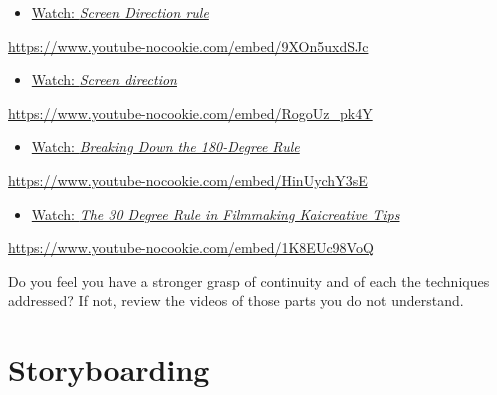 \documentclass[
  letterpaper,
  DIV=11,
  numbers=noendperiod]{scrreprt}
\providecommand{\tightlist}{%
  \setlength{\itemsep}{0pt}\setlength{\parskip}{0pt}}\usepackage{longtable,booktabs,array}
\begin{document}
\begin{tcolorbox}[enhanced jigsaw, opacityback=0, colframe=quarto-callout-note-color-frame, leftrule=.75mm, arc=.35mm, rightrule=.15mm, colbacktitle=quarto-callout-note-color!10!white, titlerule=0mm, colback=white, toprule=.15mm, bottomtitle=1mm, breakable, toptitle=1mm, title={Learning Activity}, coltitle=black, bottomrule=.15mm, left=2mm, opacitybacktitle=0.6]

\begin{itemize}
\tightlist
\item
  \href{https://www.youtube.com/watch?v=9XOn5uxdSJc}{Watch: \emph{Screen
  Direction rule}}
\end{itemize}

\url{https://www.youtube-nocookie.com/embed/9XOn5uxdSJc}

\begin{itemize}
\tightlist
\item
  \href{https://www.youtube.com/watch?v=RogoUz_pk4Y}{Watch: \emph{Screen
  direction}}
\end{itemize}

\url{https://www.youtube-nocookie.com/embed/RogoUz_pk4Y}

\begin{itemize}
\tightlist
\item
  \href{https://www.youtube.com/watch?v=HinUychY3sE}{Watch:
  \emph{Breaking Down the 180-Degree Rule}}
\end{itemize}

\url{https://www.youtube-nocookie.com/embed/HinUychY3sE}

\begin{itemize}
\tightlist
\item
  \href{https://www.youtube.com/watch?v=1K8EUc98VoQ}{Watch: \emph{The 30
  Degree Rule in Filmmaking \textbar{} Kaicreative \textbar{} Tips}}
\end{itemize}

\url{https://www.youtube-nocookie.com/embed/1K8EUc98VoQ}

Do you feel you have a stronger grasp of continuity and of each the
techniques addressed? If not, review the videos of those parts you do
not understand.

\end{tcolorbox}

\section{Storyboarding}\label{storyboarding}
\end{document}
